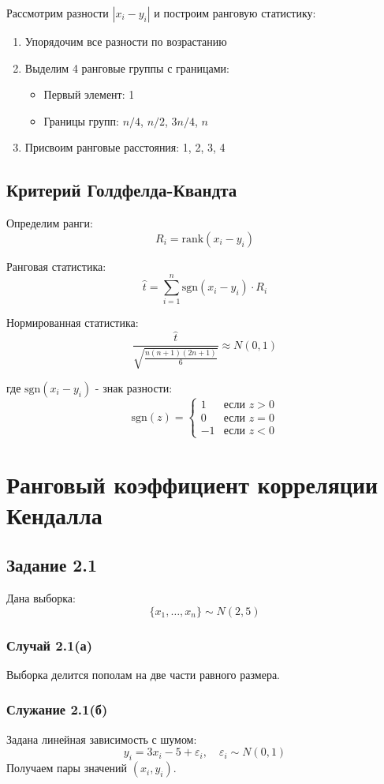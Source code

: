 \documentclass{article}
\begin{document}
Рассмотрим разности $|x_i - y_i|$ и построим ранговую статистику:

\begin{enumerate}
    \item Упорядочим все разности по возрастанию
    \item Выделим 4 ранговые группы с границами:
    \begin{itemize}
        \item Первый элемент: 1
        \item Границы групп: $n/4$, $n/2$, $3n/4$, $n$
    \end{itemize}
    \item Присвоим ранговые расстояния: 1, 2, 3, 4
\end{enumerate}

\subsection{Критерий Голдфелда-Квандта}

Определим ранги:
\[ R_i = \text{rank}(x_i - y_i) \]

Ранговая статистика:
\[ \hat{t} = \sum_{i=1}^n \text{sgn}(x_i - y_i) \cdot R_i \]

Нормированная статистика:
\[ \frac{\hat{t}}{\sqrt{\frac{n(n+1)(2n+1)}{6}}} \approx N(0,1) \]

где $\text{sgn}(x_i - y_i)$ - знак разности:
\[ \text{sgn}(z) = \begin{cases} 
1 & \text{если } z > 0 \\
0 & \text{если } z = 0 \\
-1 & \text{если } z < 0 
\end{cases} \]
\section{Ранговый коэффициент корреляции Кендалла}

\subsection{Задание 2.1}

Дана выборка:
\[ \{x_1, \dots, x_n\} \sim N(2, 5) \]

\subsubsection{Случай 2.1(а)}
Выборка делится пополам на две части равного размера.

\subsubsection{Служание 2.1(б)}
Задана линейная зависимость с шумом:
\[ y_i = 3x_i - 5 + \varepsilon_i, \quad \varepsilon_i \sim N(0, 1) \]
Получаем пары значений $(x_i, y_i)$.
\end{document}
